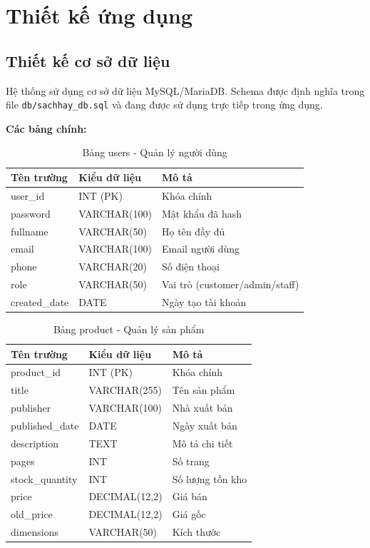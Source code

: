
\section{Thiết kế ứng dụng}

\subsection{Thiết kế cơ sở dữ liệu}

Hệ thống sử dụng cơ sở dữ liệu MySQL/MariaDB. Schema được định nghĩa trong file \texttt{db/sachhay\_db.sql} và đang được sử dụng trực tiếp trong ứng dụng.

\textbf{Các bảng chính:}

\begin{table}[H]
\centering
\begin{tabular}{|l|l|l|}
\hline
\textbf{Tên trường} & \textbf{Kiểu dữ liệu} & \textbf{Mô tả} \\
\hline
user\_id & INT (PK) & Khóa chính \\
password & VARCHAR(100) & Mật khẩu đã hash \\
fullname & VARCHAR(50) & Họ tên đầy đủ \\
email & VARCHAR(100) & Email người dùng \\
phone & VARCHAR(20) & Số điện thoại \\
role & VARCHAR(50) & Vai trò (customer/admin/staff) \\
created\_date & DATE & Ngày tạo tài khoản \\
\hline
\end{tabular}
\caption{Bảng users - Quản lý người dùng}
\label{tab:users}
\end{table}

\begin{table}[H]
\centering
\begin{tabular}{|l|l|l|}
\hline
\textbf{Tên trường} & \textbf{Kiểu dữ liệu} & \textbf{Mô tả} \\
\hline
product\_id & INT (PK) & Khóa chính \\
title & VARCHAR(255) & Tên sản phẩm \\
publisher & VARCHAR(100) & Nhà xuất bản \\
published\_date & DATE & Ngày xuất bản \\
description & TEXT & Mô tả chi tiết \\
pages & INT & Số trang \\
stock\_quantity & INT & Số lượng tồn kho \\
price & DECIMAL(12,2) & Giá bán \\
old\_price & DECIMAL(12,2) & Giá gốc \\
dimensions & VARCHAR(50) & Kích thước \\
\hline
\end{tabular}
\caption{Bảng product - Quản lý sản phẩm}
\label{tab:products}
\end{table}

